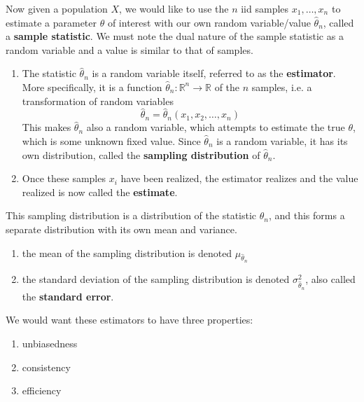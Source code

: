 \documentclass{article}
\begin{document}
    \begin{definition}
      Now given a population $X$, we would like to use the $n$ iid samples $x_1, \ldots, x_n$ to estimate a parameter $\theta$ of interest with our own random variable/value $\widehat{\theta}_n$, called a \textbf{sample statistic}. We must note the dual nature of the sample statistic as a random variable and a value is similar to that of samples. 
      \begin{enumerate}
        \item The statistic $\widehat{\theta}_n$ is a random variable itself, referred to as the \textbf{estimator}. More specifically, it is a function $\widehat{\theta}_n: \mathbb{R}^n \longrightarrow \mathbb{R}$ of the $n$ samples, i.e. a transformation of random variables 
        \begin{equation}
          \widehat{\theta}_n = \widehat{\theta}_n (x_1, x_2, \ldots, x_n)
        \end{equation}
        This makes $\widehat{\theta}_n$ also a random variable, which attempts to estimate the true $\theta$, which is some unknown fixed value. Since $\widehat{\theta}_n$ is a random variable, it has its own distribution, called the \textbf{sampling distribution} of $\widehat{\theta}_n$. 
        
        \item Once these samples $x_i$ have been realized, the estimator realizes and the value realized is now called the \textbf{estimate}. 
      \end{enumerate}
      This sampling distribution is a distribution of the statistic $\widehat{\theta}_n$, and this forms a separate distribution with its own mean and variance. 
      \begin{enumerate}
        \item the mean of the sampling distribution is denoted $\mu_{\widehat{\theta}_n}$
        \item the standard deviation of the sampling distribution is denoted $\sigma^2_{\widehat{\theta}_n}$, also called the \textbf{standard error}. 
      \end{enumerate}
    \end{definition}

    We would want these estimators to have three properties: 
    \begin{enumerate}
      \item unbiasedness
      \item consistency 
      \item efficiency
    \end{enumerate}
\end{document}
